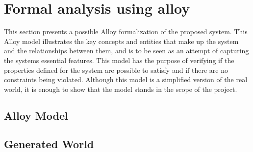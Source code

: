\documentclass[../RASD.tex]{subfiles}
\begin{document}
    \chapter{Formal analysis using alloy }\label{ch:formal-analysis-using-alloy}
    This section presents a possible Alloy formalization of the proposed system.
    This Alloy model illustrates the key concepts and entities that make up the system and the relationships
    between them, and is to be seen as an attempt of capturing the systems essential features.
    This model has the purpose of verifying if the properties defined for the system are possible to satisfy and if there are no constraints being violated.
    Although this model is a simplified version of the real world, it is enough to show that the model stands in the scope of the project.

    \section{Alloy Model}\label{sec:alloy-model}
        \vspace{2 mm}
        
        \vspace{8 mm}

    \section{Generated World}\label{sec:generated-world}
\end{document}
